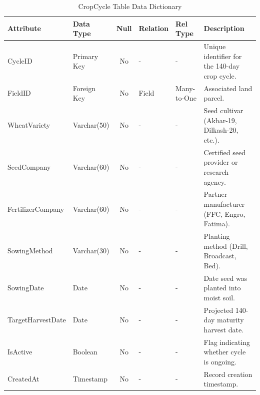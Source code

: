 \documentclass{FastFyp}
\begin{document}
\begin{table}[H]
\footnotesize
\centering
\caption{CropCycle Table Data Dictionary}
\label{tab:cropcycle_table}
\begin{tabular}{|l|l|c|l|l|p{4.5cm}|}
\hline
\textbf{Attribute} & \textbf{Data Type} & \textbf{Null} & \textbf{Relation} & \textbf{Rel Type} & \textbf{Description} \\ \hline
CycleID & Primary Key & No & - & - & Unique identifier for the 140-day crop cycle. \\ \hline
FieldID & Foreign Key & No & Field & Many-to-One & Associated land parcel. \\ \hline
WheatVariety & Varchar(50) & No & - & - & Seed cultivar (Akbar-19, Dilkash-20, etc.). \\ \hline
SeedCompany & Varchar(60) & No & - & - & Certified seed provider or research agency. \\ \hline
FertilizerCompany & Varchar(60) & No & - & - & Partner manufacturer (FFC, Engro, Fatima). \\ \hline
SowingMethod & Varchar(30) & No & - & - & Planting method (Drill, Broadcast, Bed). \\ \hline
SowingDate & Date & No & - & - & Date seed was planted into moist soil. \\ \hline
TargetHarvestDate & Date & No & - & - & Projected 140-day maturity harvest date. \\ \hline
IsActive & Boolean & No & - & - & Flag indicating whether cycle is ongoing. \\ \hline
CreatedAt & Timestamp & No & - & - & Record creation timestamp. \\ \hline
\end{tabular}
\end{table}
\end{document}
